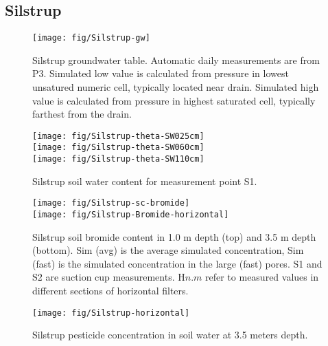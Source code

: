\subsection*{Silstrup}

\begin{figure}[htbp]
  \begin{center}
    \texttt{[image: fig/Silstrup-gw]}
  \end{center}
  \caption{Silstrup groundwater table.  Automatic daily measurements
    are from P3.  Simulated low value is calculated from pressure in
    lowest unsatured numeric cell, typically located near drain.
    Simulated high value is calculated from pressure in highest
    saturated cell, typically farthest from the drain.}
  \label{fig:Silstrup-gw}
\end{figure}\FloatBarrier

\begin{figure}[htbp]
  \begin{center}
    \texttt{[image: fig/Silstrup-theta-SW025cm]}\\
    \texttt{[image: fig/Silstrup-theta-SW060cm]}\\
    \texttt{[image: fig/Silstrup-theta-SW110cm]}
  \end{center}
  \caption{Silstrup soil water content for measurement point S1.}
  \label{fig:Silstrup-theta}
\end{figure}\FloatBarrier

\begin{figure}[htbp]
  \begin{center}
    \texttt{[image: fig/Silstrup-sc-bromide]}\\
    \texttt{[image: fig/Silstrup-Bromide-horizontal]}
  \end{center}
  \caption{Silstrup soil bromide content in 1.0 m depth (top) and 3.5
    m depth (bottom).  Sim (avg) is the average simulated
    concentration, Sim (fast) is the simulated concentration in the
    large (fast) pores.  S1 and S2 are suction cup measurements.
    H$n$.$m$ refer to measured values in different sections of
    horizontal filters.}
  \label{fig:Silstrup-bromide}
\end{figure}\FloatBarrier

\begin{figure}[htbp]
  \begin{center}
    \texttt{[image: fig/Silstrup-horizontal]}
  \end{center}
  \caption{Silstrup pesticide concentration in soil water at 3.5 meters depth.}
  \label{fig:Silstrup-horizontal}
\end{figure}\FloatBarrier

